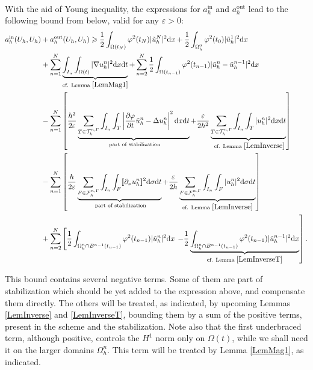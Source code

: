 \documentclass[11pt,a4paper]{article}
\theoremstyle{plain}
\theoremstyle{definition}
\theoremstyle{remark}
\numberwithin{equation}{section}
\newcommand{\dx}{\mathrm{d}x}
\newcommand{\dsigma}{\mathrm{d}\sigma}
\newcommand{\dt}{\mathrm{d}t}
\begin{document}
\

With the aid of Young inequality, the expressions for $a_h^{\text{in}}$ and
$a_h^{\text{out}}$ lead to the following bound from below, valid for any
$\varepsilon > 0$:
\begin{align}
  \label{BIGbound} a_h^{\text{in}} (U_h, U_h) & + a_h^{\text{out}} (U_h, U_h)
   \geqslant \frac{1}{2}  \int_{\Omega (t_N)} \varphi^2 (t_N) | \tilde{u}_h^N |^2
  \dx + \frac{1}{2}  \int_{\Omega_h^0} \varphi^2 (t_0) | \tilde{u}_h^1 |^2
  \dx
\\
 & + \sum_{n = 1}^N \underbrace{\int_{I_n} \int_{\Omega (t)} | \nabla u^n_h
   |^2 \dx \dt}_{\text{cf. Lemma } \ref{LemMag1}} +
   \sum_{n = 2}^N \frac{1}{2}  \int_{\Omega (t_{n - 1})} \varphi^2 (t_{n - 1})  |
   \tilde{u}_h^n - \tilde{u}_h^{n - 1} |^2 \dx
 \notag   \\
 & - \sum_{n = 1}^N \left[ \frac{h^2}{2 \varepsilon}  \underbrace{\sum_{T\in\mathcal{T}_h^{n,\Gamma}}\int_{I_n}
   \int_{T} \left| \frac{\partial \varphi}{\partial t}
   \tilde{u}_h^n - \Delta u^n_h \right|^2 \dx \dt}_{\text{ part of stabilization}} + \frac{\varepsilon}{2 h^2}
   \underbrace{\sum_{T\in\mathcal{T}_h^{n,\Gamma}}\int_{I_n} \int_{T} |u^n_h |^2 \dx
   \dt}_{\text{ cf.  Lemma } \ref{LemInverse}} \right]
 \notag \\
 & - \sum_{n = 1}^N \left[ \frac{h}{2 \varepsilon}  \underbrace{
  \sum_{F\in\mathcal{F}_h^{n, \Gamma}} \int_{I_n} \int_{F} [\![\partial_\nu u^n_h]\!]^2 \dsigma \dt}_{\text{ part of stabilization}} +
   \frac{\varepsilon}{2 h} \underbrace{ \sum_{F\in\mathcal{F}_h^{n, \Gamma}}\int_{I_n}   \int_{F}|u^n_h |^2 \dsigma \dt}_{\text{cf. Lemma }
   \ref{LemInverse}}  \right]
  \notag \\
    &+ \sum_{n = 2}^N \left[ \frac{1}{2}  \int_{\Omega^n_h \cap B^{n - 1} (t_{n - 1})} \varphi^2 (t_{n - 1}) | \tilde{u}_h^n |^2 \dx \right.
   \left. - \frac{1}{2}  \underbrace{\int_{\Omega^n_h \cap B^{n - 1}  (t_{n - 1})} \varphi^2 (t_{n - 1}) | \tilde{u}_h^{n - 1} |^2 \dx }_{\text{cf. Lemma } \ref{LemInverseT}} \right].
\notag
\end{align}



This bound contains several negative terms. Some of them are part of
stabilization which should be yet added to the expression above, and
compensate them directly. The others will be treated, as indicated, by
upcoming Lemmas \ref{LemInverse} and \ref{LemInverseT}, bounding them by a sum
of the positive terms, present in the scheme and the stabilization. Note also
that the first underbraced term, although positive, controls the $H^1$ norm
only on $\Omega (t)$, while we shall need it on the larger domains
$\Omega^n_h$. This term will be treated by Lemma \ref{LemMag1}, as indicated.
\end{document}

